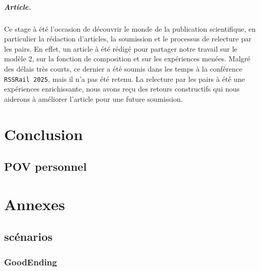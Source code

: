 \documentclass[oneside, a4paper, 11pt]{book}
\begin{document}
\paragraph{Article.}
Ce stage à été l'occasion de découvrir le monde de la publication scientifique, en particulier la rédaction d'articles, la soumission et le processus de relecture par les pairs. 
En effet, un article à été rédigé pour partager notre travail sur le modèle 2, sur la fonction de composition et sur les expériences menées. Malgré des délais très courts, ce dernier a été soumis dans les temps à la conférence \texttt{RSSRail 2025}, mais il n'a pas été retenu.
La relecture par les pairs à été une expériences enrichissante, nous avons reçu des retours constructifs qui nous aiderons à améliorer l'article pour une future soumission.








\chapter{Conclusion}

\section{POV personnel}

\appendix

\chapter{Annexes}
\section{scénarios}
\subsection{GoodEnding}
\label{scenar:goodEnding}

\backmatter
%
%
\printindex
\end{document}
